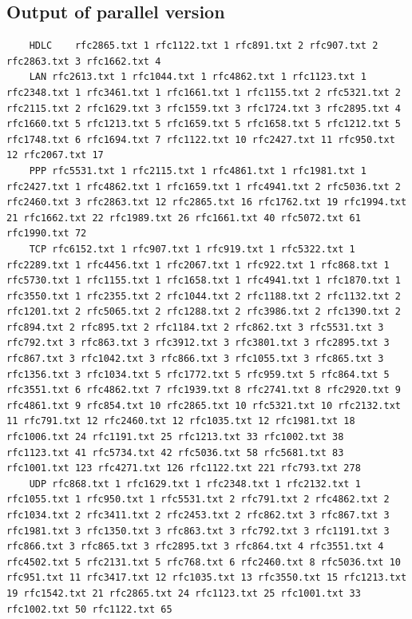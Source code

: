 \documentclass[11pt, letterpaper]{article}
\begin{document}
	\subsection{Output of parallel version}
	\vspace{-0.2in}
	\begin{lstlisting}
	HDLC	rfc2865.txt 1 rfc1122.txt 1 rfc891.txt 2 rfc907.txt 2 rfc2863.txt 3 rfc1662.txt 4 
	LAN	rfc2613.txt 1 rfc1044.txt 1 rfc4862.txt 1 rfc1123.txt 1 rfc2348.txt 1 rfc3461.txt 1 rfc1661.txt 1 rfc1155.txt 2 rfc5321.txt 2 rfc2115.txt 2 rfc1629.txt 3 rfc1559.txt 3 rfc1724.txt 3 rfc2895.txt 4 rfc1660.txt 5 rfc1213.txt 5 rfc1659.txt 5 rfc1658.txt 5 rfc1212.txt 5 rfc1748.txt 6 rfc1694.txt 7 rfc1122.txt 10 rfc2427.txt 11 rfc950.txt 12 rfc2067.txt 17 
	PPP	rfc5531.txt 1 rfc2115.txt 1 rfc4861.txt 1 rfc1981.txt 1 rfc2427.txt 1 rfc4862.txt 1 rfc1659.txt 1 rfc4941.txt 2 rfc5036.txt 2 rfc2460.txt 3 rfc2863.txt 12 rfc2865.txt 16 rfc1762.txt 19 rfc1994.txt 21 rfc1662.txt 22 rfc1989.txt 26 rfc1661.txt 40 rfc5072.txt 61 rfc1990.txt 72 
	TCP	rfc6152.txt 1 rfc907.txt 1 rfc919.txt 1 rfc5322.txt 1 rfc2289.txt 1 rfc4456.txt 1 rfc2067.txt 1 rfc922.txt 1 rfc868.txt 1 rfc5730.txt 1 rfc1155.txt 1 rfc1658.txt 1 rfc4941.txt 1 rfc1870.txt 1 rfc3550.txt 1 rfc2355.txt 2 rfc1044.txt 2 rfc1188.txt 2 rfc1132.txt 2 rfc1201.txt 2 rfc5065.txt 2 rfc1288.txt 2 rfc3986.txt 2 rfc1390.txt 2 rfc894.txt 2 rfc895.txt 2 rfc1184.txt 2 rfc862.txt 3 rfc5531.txt 3 rfc792.txt 3 rfc863.txt 3 rfc3912.txt 3 rfc3801.txt 3 rfc2895.txt 3 rfc867.txt 3 rfc1042.txt 3 rfc866.txt 3 rfc1055.txt 3 rfc865.txt 3 rfc1356.txt 3 rfc1034.txt 5 rfc1772.txt 5 rfc959.txt 5 rfc864.txt 5 rfc3551.txt 6 rfc4862.txt 7 rfc1939.txt 8 rfc2741.txt 8 rfc2920.txt 9 rfc4861.txt 9 rfc854.txt 10 rfc2865.txt 10 rfc5321.txt 10 rfc2132.txt 11 rfc791.txt 12 rfc2460.txt 12 rfc1035.txt 12 rfc1981.txt 18 rfc1006.txt 24 rfc1191.txt 25 rfc1213.txt 33 rfc1002.txt 38 rfc1123.txt 41 rfc5734.txt 42 rfc5036.txt 58 rfc5681.txt 83 rfc1001.txt 123 rfc4271.txt 126 rfc1122.txt 221 rfc793.txt 278 
	UDP	rfc868.txt 1 rfc1629.txt 1 rfc2348.txt 1 rfc2132.txt 1 rfc1055.txt 1 rfc950.txt 1 rfc5531.txt 2 rfc791.txt 2 rfc4862.txt 2 rfc1034.txt 2 rfc3411.txt 2 rfc2453.txt 2 rfc862.txt 3 rfc867.txt 3 rfc1981.txt 3 rfc1350.txt 3 rfc863.txt 3 rfc792.txt 3 rfc1191.txt 3 rfc866.txt 3 rfc865.txt 3 rfc2895.txt 3 rfc864.txt 4 rfc3551.txt 4 rfc4502.txt 5 rfc2131.txt 5 rfc768.txt 6 rfc2460.txt 8 rfc5036.txt 10 rfc951.txt 11 rfc3417.txt 12 rfc1035.txt 13 rfc3550.txt 15 rfc1213.txt 19 rfc1542.txt 21 rfc2865.txt 24 rfc1123.txt 25 rfc1001.txt 33 rfc1002.txt 50 rfc1122.txt 65 
	
	\end{lstlisting}
	
\end{document}
